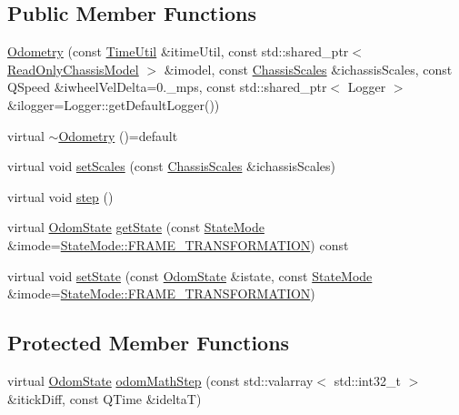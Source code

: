 \subsection*{Public Member Functions}
\begin{DoxyCompactItemize}
\item 
\mbox{\hyperlink{classokapi_1_1Odometry_a495d43ceb8cc03513e8365fdc1b37974}{Odometry}} (const \mbox{\hyperlink{classokapi_1_1TimeUtil}{Time\+Util}} \&itime\+Util, const std\+::shared\+\_\+ptr$<$ \mbox{\hyperlink{classokapi_1_1ReadOnlyChassisModel}{Read\+Only\+Chassis\+Model}} $>$ \&imodel, const \mbox{\hyperlink{classokapi_1_1ChassisScales}{Chassis\+Scales}} \&ichassis\+Scales, const Q\+Speed \&iwheel\+Vel\+Delta=0.\+\_\+mps, const std\+::shared\+\_\+ptr$<$ Logger $>$ \&ilogger=\+Logger\+::get\+Default\+Logger())
\item 
virtual \mbox{\hyperlink{classokapi_1_1Odometry_acdaa18c094c9ca21b094a85aa4f3081e}{$\sim$\+Odometry}} ()=default
\item 
virtual void \mbox{\hyperlink{classokapi_1_1Odometry_a5330b093e51d650b8ff2c6fe0ec2d27e}{set\+Scales}} (const \mbox{\hyperlink{classokapi_1_1ChassisScales}{Chassis\+Scales}} \&ichassis\+Scales)
\item 
virtual void \mbox{\hyperlink{classokapi_1_1Odometry_a04586a88418c606f7bbd0ac3287c730d}{step}} ()
\item 
virtual \mbox{\hyperlink{structokapi_1_1OdomState}{Odom\+State}} \mbox{\hyperlink{classokapi_1_1Odometry_a1ca6892feeeca68de3eb6faf6cf4bd18}{get\+State}} (const \mbox{\hyperlink{namespaceokapi_af37fbd761bd859a00ff4dd4a87dd8c07}{State\+Mode}} \&imode=\mbox{\hyperlink{namespaceokapi_af37fbd761bd859a00ff4dd4a87dd8c07ad5ed7666e5cebf60d3af20a5a46edf3b}{State\+Mode\+::\+F\+R\+A\+M\+E\+\_\+\+T\+R\+A\+N\+S\+F\+O\+R\+M\+A\+T\+I\+ON}}) const
\item 
virtual void \mbox{\hyperlink{classokapi_1_1Odometry_a0f18a0770477130307b7c6a9702b0cc6}{set\+State}} (const \mbox{\hyperlink{structokapi_1_1OdomState}{Odom\+State}} \&istate, const \mbox{\hyperlink{namespaceokapi_af37fbd761bd859a00ff4dd4a87dd8c07}{State\+Mode}} \&imode=\mbox{\hyperlink{namespaceokapi_af37fbd761bd859a00ff4dd4a87dd8c07ad5ed7666e5cebf60d3af20a5a46edf3b}{State\+Mode\+::\+F\+R\+A\+M\+E\+\_\+\+T\+R\+A\+N\+S\+F\+O\+R\+M\+A\+T\+I\+ON}})
\end{DoxyCompactItemize}
\subsection*{Protected Member Functions}
\begin{DoxyCompactItemize}
\item 
virtual \mbox{\hyperlink{structokapi_1_1OdomState}{Odom\+State}} \mbox{\hyperlink{classokapi_1_1Odometry_a8fc2c3d72a0c475a7333eb9affe593a5}{odom\+Math\+Step}} (const std\+::valarray$<$ std\+::int32\+\_\+t $>$ \&itick\+Diff, const Q\+Time \&ideltaT)
\end{DoxyCompactItemize}
